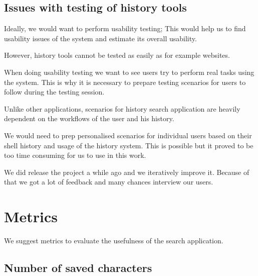 % 


\subsection{Issues with testing of history tools}



Ideally, we would want to perform usability testing; This would help us to find usability issues of the system and estimate its overall usability.

However, history tools cannot be tested as easily as for example websites.

When doing usability testing we want to see users try to perform real tasks using the system. This is why it is necessary to prepare testing scenarios for users to follow during the testing session.

Unlike other applications, scenarios for history search application are heavily dependent on the workflows of the user and his history.


We would need to prep personalised scenarios for individual users based on their shell history and usage of the history system.
This is possible but it proved to be too time consuming for us to use in this work.


We did release the project a while ago and we iteratively improve it. Because of that we got a lot of feedback and many chances interview our users. 





\section{Metrics}

We suggest metrics to evaluate the usefulness of the search application.



\subsection{Number of saved characters}




